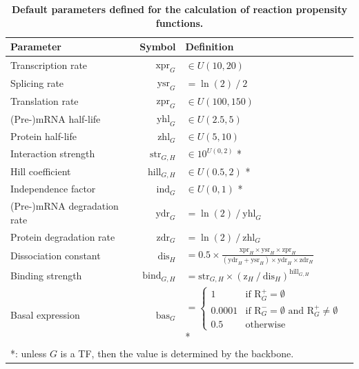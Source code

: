 \documentclass[
  table,
  10pt,
  a4paper]{article}
\begin{document}
\begin{table}[H]
    \caption{
      \textbf{Default parameters defined for the calculation of reaction propensity functions.}
    } \label{tab:reaction_params}
    \centering
    \begin{tabular}{|lrl|}
        \hline
        Parameter & Symbol & Definition \\ \hline \hline
        Transcription rate & $\text{xpr}_{G}$ & $\in U(10, 20)$ \\
        Splicing rate & $\text{ysr}_{G}$ & $= \ln(2)\ /\ 2$ \\
        Translation rate & $\text{zpr}_{G}$ & $\in U(100, 150)$ \\
        (Pre-)mRNA half-life & $\text{yhl}_{G}$ & $\in U(2.5, 5)$ \\
        Protein half-life & $\text{zhl}_{G}$ & $\in U(5, 10)$ \\
        Interaction strength & $\text{str}_{G,H}$ & $\in 10^{U(0, 2)}$ * \\
        Hill coefficient & $\text{hill}_{G,H}$ & $\in U(0.5, 2)$ * \\
        Independence factor & $\text{ind}_{G}$ & $\in U(0, 1)$ * \\ \hline\hline
        (Pre-)mRNA degradation rate & $\text{ydr}_{G}$ & $= \ln(2)\ /\ \text{yhl}_{G}$ \\
        Protein degradation rate & $\text{zdr}_{G}$ & $= \ln(2)\ /\ \text{zhl}_{G}$ \\
        Dissociation constant & $\text{dis}_{H}$ & $= 0.5 \times \frac{\text{xpr}_{H} \times \text{ysr}_{H} \times \text{zpr}_{H}}{(\text{ydr}_{H} + \text{ysr}_{H}) \times \text{ydr}_{H} \times \text{zdr}_{H}}$ \\
        Binding strength & $\text{bind}_{G,H}$ & $= \text{str}_{G,H} \times \left(\text{z}_{H}\ /\ \text{dis}_{H}\right) ^ {\text{hill}_{G,H}}$ \\
        Basal expression & $\text{bas}_{G}$ & $= \begin{cases} 1 & \mbox{if } \text{R}^+_{G} = \emptyset \\ 0.0001 & \mbox{if } \text{R}^-_{G} = \emptyset \mbox{ and } \text{R}^+_{G} \neq \emptyset \\ 0.5 & \mbox{otherwise} \end{cases}$ * \\ \hline
        \multicolumn{3}{l}{*: unless $G$ is a TF, then the value is determined by the backbone.}
    \end{tabular}
\end{table}
\end{document}
